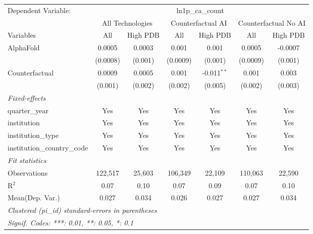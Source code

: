 \begingroup
\centering
\begin{tabular}{lcccccc}
   \tabularnewline \midrule \midrule
   Dependent Variable: & \multicolumn{6}{c}{ln1p\_ca\_count}\\
 & \multicolumn{2}{c}{All Technologies} & \multicolumn{2}{c}{Counterfactual AI} & \multicolumn{2}{c}{Counterfactual No AI} \\
\cmidrule(lr){1-1}\cmidrule(lr){2-3} \cmidrule(lr){4-5} \cmidrule(lr){6-7}
Variables & \multicolumn{1}{c}{All} & \multicolumn{1}{c}{High PDB} & \multicolumn{1}{c}{All} & \multicolumn{1}{c}{High PDB} & \multicolumn{1}{c}{All} & \multicolumn{1}{c}{High PDB} \\
\cmidrule(lr){1-1}\cmidrule(lr){2-2} \cmidrule(lr){3-3} \cmidrule(lr){4-4} \cmidrule(lr){5-5} \cmidrule(lr){6-6} \cmidrule(lr){7-7}
   AlphaFold                    & 0.0005   & 0.0003  & 0.001    & 0.001         & 0.0005   & -0.0007\\   
                                & (0.0008) & (0.001) & (0.0009) & (0.001)       & (0.0009) & (0.001)\\   
   Counterfactual               & 0.0009   & 0.0005  & 0.001    & -0.011$^{**}$ & 0.001    & 0.003\\   
                                & (0.001)  & (0.002) & (0.002)  & (0.005)       & (0.002)  & (0.003)\\   
   \midrule
   \emph{Fixed-effects}\\
   quarter\_year                & Yes      & Yes     & Yes      & Yes           & Yes      & Yes\\  
   institution                  & Yes      & Yes     & Yes      & Yes           & Yes      & Yes\\  
   institution\_type            & Yes      & Yes     & Yes      & Yes           & Yes      & Yes\\  
   institution\_country\_code   & Yes      & Yes     & Yes      & Yes           & Yes      & Yes\\  
   \midrule
   \emph{Fit statistics}\\
   Observations                 & 122,517  & 25,603  & 106,349  & 22,109        & 110,063  & 22,590\\  
   R$^2$                        & 0.07     & 0.10    & 0.07     & 0.09          & 0.07     & 0.10\\  
Mean(Dep. Var.) & 0.027 & 0.034 & 0.026 & 0.027 & 0.027 & 0.034 \\
   \midrule \midrule
   \multicolumn{7}{l}{\emph{Clustered (pi\_id) standard-errors in parentheses}}\\
   \multicolumn{7}{l}{\emph{Signif. Codes: ***: 0.01, **: 0.05, *: 0.1}}\\
\end{tabular}
\par\endgroup
